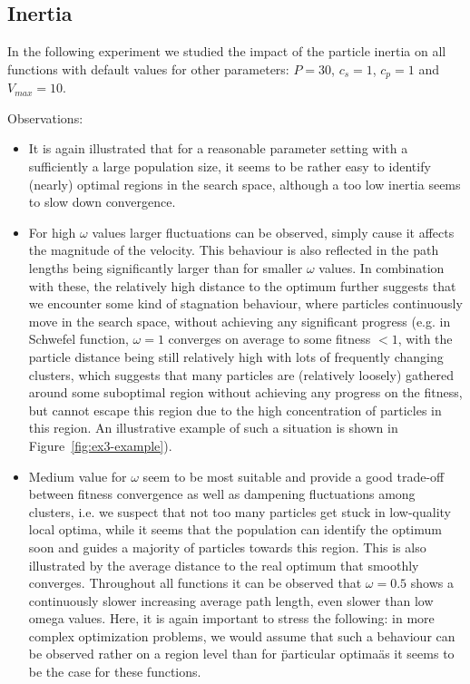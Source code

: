 \documentclass[12pt]{article}
\begin{document}
\subsection{Inertia}
In the following experiment we studied the impact of the particle inertia on all functions with default values for other parameters: $P=30$, $c_s=1$, $c_p=1$ and $V_{max}=10$. 

Observations:
\begin{itemize}
	\item It is again illustrated that for a reasonable parameter setting with a sufficiently a large population size, it seems to be rather easy to identify (nearly) optimal regions in the search space, although a too low inertia seems to slow down convergence. 
	\item For high $\omega$ values larger fluctuations can be observed, simply cause it affects the magnitude of the velocity. This behaviour is also reflected in the path lengths being significantly larger than for smaller $\omega$ values. In combination with these, the relatively high distance to the optimum further suggests that we encounter some kind of stagnation behaviour, where particles continuously move in the search space, without achieving any significant progress (e.g. in Schwefel function, $\omega=1$ converges on average to some fitness $<1$, with the particle distance being still relatively high with lots of frequently changing clusters, which suggests that many particles are (relatively loosely) gathered around some suboptimal region without achieving any progress on the fitness, but cannot escape this region due to the high concentration of particles in this region. An illustrative example of such a situation is shown in Figure~\ref{fig:ex3-example}).
	\item Medium value for $\omega$ seem to be most suitable and provide a good trade-off between fitness convergence as well as dampening fluctuations among clusters, i.e. we suspect that not too many particles get stuck in low-quality local optima, while it seems that the population can identify the optimum soon and guides a majority of particles towards this region. This is also illustrated by the average distance to the real optimum that smoothly converges. Throughout all functions it can be observed that $\omega=0.5$ shows a continuously slower increasing average path length, even slower than low omega values. Here, it is again important to stress the following: in more complex optimization problems, we would assume that such a behaviour can be observed rather on a region level than for \"particular optima\" as it seems to be the case for these functions.

	
\end{itemize}
\end{document}
